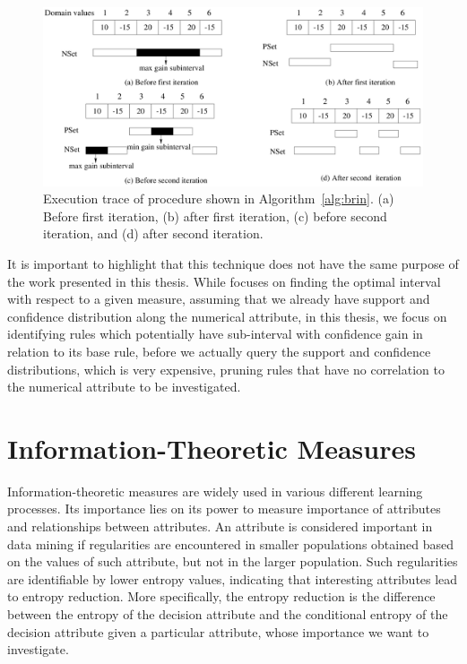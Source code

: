 \begin{figure}
\begin{center}
  \includegraphics[width=1\linewidth]{./Figures/optgain1d.png}
\end{center}
\caption{Execution trace of procedure shown in Algorithm~\ref{alg:brin}. (a) Before first iteration, (b) after first
iteration, (c) before second iteration, and (d) after second iteration\citep{Brin99miningoptimized}.}
\label{fig:optgain}
\end{figure}

It is important to highlight that this technique does not have the same purpose of the work presented in this thesis.
While \citet{Brin99miningoptimized} focuses on finding the optimal interval with respect to a given measure, assuming
that we already have support and confidence distribution along the numerical attribute, in this thesis, we focus on
identifying rules which potentially have sub-interval with confidence gain in relation to its base rule, before we
actually query the support and confidence distributions, which is very expensive, pruning rules that have no
correlation to the numerical attribute to be investigated. 

\section{Information-Theoretic Measures}
\label{sec:rw-infotheoreticmeasures}

Information-theoretic measures are widely used in various different learning processes. Its importance lies on its
power
to measure importance of attributes and relationships between attributes. An attribute is considered important in data
mining if regularities are encountered in smaller populations obtained based on the values of such attribute, but not
in
the larger population. Such regularities are identifiable by lower entropy values, indicating that interesting
attributes lead to entropy reduction. More specifically, the entropy reduction is the difference between the entropy
of
the decision attribute and the conditional entropy of the decision attribute given a particular attribute, whose
importance we want to investigate.

